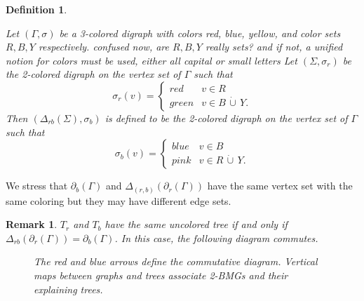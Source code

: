 \documentclass[final,3p,times]{elsarticle}
\newtheorem{definition}{Definition}[section]
\newtheorem{remark}[theorem]{Remark}%
\newcommand{\TODO}[1]{\begingroup\color{red}#1\endgroup}
\begin{document}
\begin{definition}
\label{def:delta_operator}

Let $(\Gamma,\sigma)$ be a 3-colored digraph with colors red, blue, yellow, and color sets $R,B,Y$ respectively.
\TODO{confused now, are $R,B,Y$ really sets? and if not, a unified notion for colors must be used, either all
capital or small letters }
Let $(\Sigma,\sigma_r)$ be the 2-colored digraph on the vertex set of $\Gamma$ such that
\begin{equation}\label{def:sigma-r}
\sigma_r(v)= \begin{cases} 
      red & v\in R \\
     green & v\in B \,\dot{\cup}\, Y.
   \end{cases}
\end{equation}
Then
$(\Delta_{rb}(\Sigma),\sigma_b)$ is defined to be the 2-colored digraph on the vertex set of $\Gamma$ such that
\begin{equation}\label{def:sigma-b}
\sigma_b(v)= \begin{cases} 
    blue & v\in B \\
     pink & v\in R \,\dot{\cup}\, Y.
   \end{cases}
\end{equation}
 \end{definition}
We stress that $\partial_b(\Gamma)$ and $\Delta_{(r,b)}(\partial_r(\Gamma))$ have the same vertex set with the same coloring but they may have different edge sets. 

\begin{remark}
\label{obs:delta_operator}
$T_r$ and $T_b$ have the same uncolored tree if and only if $\Delta_{rb}(\partial_r(\Gamma))=\partial_b(\Gamma)$. In this case, the following diagram commutes.
\begin{figure}[ht]
  \centering
{}
\caption{The red and blue arrows define the commutative diagram. Vertical maps between graphs and trees associate 2-BMGs and their explaining trees.}
\label{fig:diagram}
\end{figure}
\end{remark}
\end{document}
